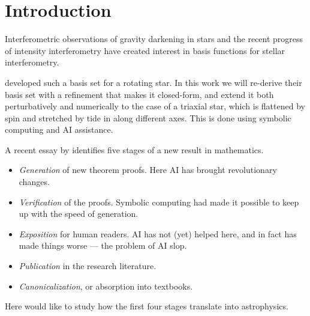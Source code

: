 \section{Introduction}

Interferometric observations of gravity darkening in stars
\citep[e.g.,][]{2018MNRAS.480.1263H,2018A&A...619A.167D} and the
recent progress of intensity interferometry
\citep{2025ApJ...995..191A} have created interest in basis functions
for stellar interferometry.

\cite{2026PASP..138e4504D} developed such a basis set for a rotating
star.  In this work we will re-derive their basis set with a
refinement that makes it closed-form, and extend it both
perturbatively and numerically to the case of a triaxial star, which
is flattened by spin and stretched by tide in along different axes.
This is done using symbolic computing and AI assistance.

A recent essay by \citet{tao2026} identifies five stages of a new
result in mathematics.
\begin{itemize}
\item \textit{Generation} of new theorem proofs.  Here AI has brought
  revolutionary changes.
\item \textit{Verification} of the proofs.  Symbolic computing had
  made it possible to keep up with the speed of generation.
\item \textit{Exposition} for human readers.  AI has not (yet) helped
  here, and in fact has made things worse --- the problem of AI slop.
\item \textit{Publication} in the research literature.
\item \textit{Canonicalization}, or absorption into textbooks.
\end{itemize}
Here would like to study how the first four stages translate into
astrophysics.


